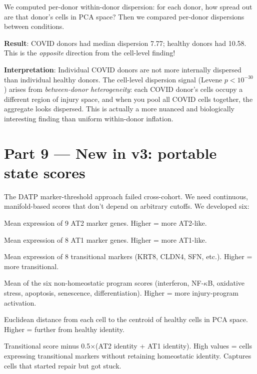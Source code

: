 \documentclass[11pt]{article}
\begin{document}
\begin{vnewbox}
We computed per-donor within-donor dispersion: for each donor, how spread out are that donor's cells in PCA space? Then we compared per-donor dispersions between conditions.

\textbf{Result}: COVID donors had median dispersion 7.77; healthy donors had 10.58. This is the \emph{opposite} direction from the cell-level finding!

\textbf{Interpretation}: Individual COVID donors are not more internally dispersed than individual healthy donors. The cell-level dispersion signal (Levene $p < 10^{-30}$) arises from \emph{between-donor heterogeneity}: each COVID donor's cells occupy a different region of injury space, and when you pool all COVID cells together, the aggregate looks dispersed. This is actually a more nuanced and biologically interesting finding than uniform within-donor inflation.
\end{vnewbox}


\section{Part 9 --- New in v3: portable state scores}

\begin{vnewbox}
The DATP marker-threshold approach failed cross-cohort. We need continuous, manifold-based scores that don't depend on arbitrary cutoffs. We developed six:
\end{vnewbox}

\begin{description}[style=nextline]
\item[1. AT2 identity score] Mean expression of 9 AT2 marker genes. Higher = more AT2-like.
\item[2. AT1 identity score] Mean expression of 8 AT1 marker genes. Higher = more AT1-like.
\item[3. Transitional score] Mean expression of 8 transitional markers (KRT8, CLDN4, SFN, etc.). Higher = more transitional.
\item[4. Injury composite] Mean of the six non-homeostatic program scores (interferon, NF-$\kappa$B, oxidative stress, apoptosis, senescence, differentiation). Higher = more injury-program activation.
\item[5. Coherence loss] Euclidean distance from each cell to the centroid of healthy cells in PCA space. Higher = further from healthy identity.
\item[6. Repair failure] Transitional score minus 0.5$\times$(AT2 identity + AT1 identity). High values = cells expressing transitional markers without retaining homeostatic identity. Captures cells that started repair but got stuck.
\end{description}
\end{document}
